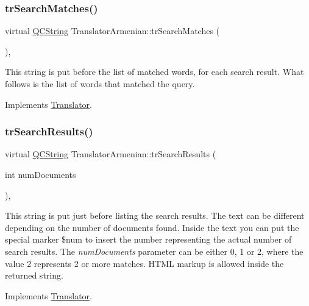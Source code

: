 \subsubsection{\texorpdfstring{trSearchMatches()}{trSearchMatches()}}
{\footnotesize\ttfamily virtual \mbox{\hyperlink{class_q_c_string}{Q\+C\+String}} Translator\+Armenian\+::tr\+Search\+Matches (\begin{DoxyParamCaption}{ }\end{DoxyParamCaption})\hspace{0.3cm}{\ttfamily [inline]}, {\ttfamily [virtual]}}

This string is put before the list of matched words, for each search result. What follows is the list of words that matched the query. 

Implements \mbox{\hyperlink{class_translator}{Translator}}.

\mbox{\label{class_translator_armenian_aacb00f3521c9467e7d05c47c4583b1f1}} 
\subsubsection{\texorpdfstring{trSearchResults()}{trSearchResults()}}
{\footnotesize\ttfamily virtual \mbox{\hyperlink{class_q_c_string}{Q\+C\+String}} Translator\+Armenian\+::tr\+Search\+Results (\begin{DoxyParamCaption}\item[{int}]{num\+Documents }\end{DoxyParamCaption})\hspace{0.3cm}{\ttfamily [inline]}, {\ttfamily [virtual]}}

This string is put just before listing the search results. The text can be different depending on the number of documents found. Inside the text you can put the special marker \$num to insert the number representing the actual number of search results. The {\itshape num\+Documents} parameter can be either 0, 1 or 2, where the value 2 represents 2 or more matches. H\+T\+ML markup is allowed inside the returned string. 

Implements \mbox{\hyperlink{class_translator}{Translator}}.

\mbox{\label{class_translator_armenian_ac239dd53252966f81596418c5b6c519a}} 
